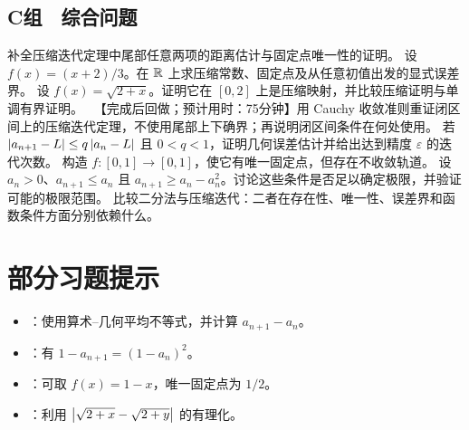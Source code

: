 \subsection*{C组　综合问题}
\begin{enumerate}[label=\textbf{\thechapter.\arabic*.},resume]
  补全压缩迭代定理中尾部任意两项的距离估计与固定点唯一性的证明。
  设 \(f(x)=(x+2)/3\)。在 \(\mathbb{R}\) 上求压缩常数、固定点及从任意初值出发的显式误差界。
  设 \(f(x)=\sqrt{2+x}\)。证明它在 \([0,2]\) 上是压缩映射，并比较压缩证明与单调有界证明。
  \ 【完成后回做；预计用时：75分钟】用 Cauchy 收敛准则重证闭区间上的压缩迭代定理，不使用尾部上下确界；再说明闭区间条件在何处使用。
  若 \(\left|a_{n+1}-L\right|\le q\left|a_n-L\right|\) 且 \(0<q<1\)，证明几何误差估计并给出达到精度 \(\varepsilon\) 的迭代次数。
  构造 \(f:[0,1]\to[0,1]\)，使它有唯一固定点，但存在不收敛轨道。
  设 \(a_n>0\)、\(a_{n+1}\le a_n\) 且 \(a_{n+1}\ge a_n-a_n^2\)。讨论这些条件是否足以确定极限，并验证可能的极限范围。
  比较二分法与压缩迭代：二者在存在性、唯一性、误差界和函数条件方面分别依赖什么。
\end{enumerate}

\section*{部分习题提示}
\begin{itemize}
 \item {}：使用算术--几何平均不等式，并计算 \(a_{n+1}-a_n\)。
 \item {}：有 \(1-a_{n+1}=(1-a_n)^2\)。
 \item {}：可取 \(f(x)=1-x\)，唯一固定点为 \(1/2\)。
 \item {}：利用 \(\left|\sqrt{2+x}-\sqrt{2+y}\right|\) 的有理化。
\end{itemize}
